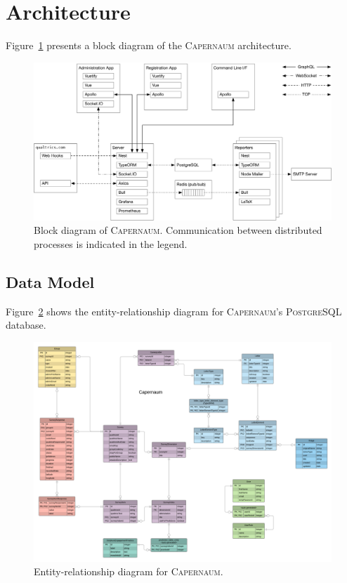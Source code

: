 \documentclass{article}
\newcommand{\caper}{\textsc{Capernaum}}
\newcommand{\pg}{\textsc{PostgreSQL}}
\begin{document}
\section{Architecture}
\label{sec:architecture}

Figure~\ref{fig:block-diagram}
presents a block diagram
of the \caper{} architecture.

\begin{figure}
  \centering
  \includegraphics[width=\textwidth]{block-diagram}
  \caption{Block diagram of \caper.
    Communication between distributed processes is indicated in the legend.}
  \label{fig:block-diagram}
\end{figure}

\subsection{Data Model}
\label{sec:data-model}

Figure~\ref{fig:erd} shows the entity-relationship diagram for \caper's \pg{} database.
\begin{figure}
  \centering
  \includegraphics[width=\textwidth]{data-model}
  \caption{Entity-relationship diagram for \caper.}
  \label{fig:erd}
\end{figure}
\end{document}
